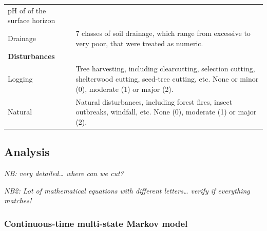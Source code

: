 \documentclass[a4paperpaper,]{article}
\begin{document}
\begin{longtable}[]{@{}ll@{}}
\begin{minipage}[t]{0.73\columnwidth}
pH of of the surface horizon\strut
\end{minipage}\tabularnewline
\begin{minipage}[t]{0.21\columnwidth}\raggedright
Drainage\strut
\end{minipage} & \begin{minipage}[t]{0.73\columnwidth}\raggedright
7 classes of soil drainage, which range from excessive to very poor,
that were treated as numeric.\strut
\end{minipage}\tabularnewline
\begin{minipage}[t]{0.21\columnwidth}\raggedright
\textbf{Disturbances}\strut
\end{minipage} & \begin{minipage}[t]{0.73\columnwidth}\raggedright
\strut
\end{minipage}\tabularnewline
\begin{minipage}[t]{0.21\columnwidth}\raggedright
Logging\strut
\end{minipage} & \begin{minipage}[t]{0.73\columnwidth}\raggedright
Tree harvesting, including clearcutting, selection cutting, shelterwood
cutting, seed-tree cutting, etc. None or minor (0), moderate (1) or
major (2).\strut
\end{minipage}\tabularnewline
\begin{minipage}[t]{0.21\columnwidth}\raggedright
Natural\strut
\end{minipage} & \begin{minipage}[t]{0.73\columnwidth}\raggedright
Natural disturbances, including forest fires, insect outbreaks,
windfall, etc. None (0), moderate (1) or major (2).\strut
\end{minipage}\tabularnewline
\bottomrule
\end{longtable}

\hypertarget{analysis}{%
\subsection{Analysis}\label{analysis}}

\emph{NB: very detailed\ldots{} where can we cut?}

\emph{NB2: Lot of mathematical equations with different letters\ldots{}
verify if everything matches!}

\hypertarget{continuous-time-multi-state-markov-model}{%
\subsubsection{Continuous-time multi-state Markov
model}\label{continuous-time-multi-state-markov-model}}
\end{document}
